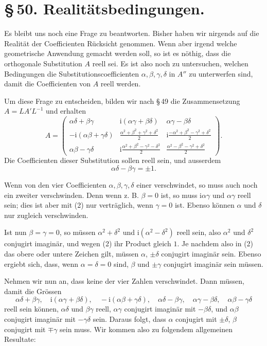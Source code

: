 \documentclass[11pt]{article}
\providecommand{\ii}{\mathrm{i}}
\begin{document}
\section*{\S\,50. Realitätsbedingungen.}

Es bleibt uns noch eine Frage zu beantworten. Bisher haben wir nirgends auf die Realität der Coefficienten Rücksicht genommen. Wenn aber irgend welche geometrische Anwendung gemacht werden soll, so ist es nöthig, dass die orthogonale Substitution $A$ reell sei. Es ist also noch zu untersuchen, welchen Bedingungen die Substitutionscoefficienten $\alpha,\beta,\gamma,\delta$ in $A''$ zu unterwerfen sind, damit die Coefficienten von $A$ reell werden.

Um diese Frage zu entscheiden, bilden wir nach \S\,49 die Zusammensetzung $A=LA'L^{-1}$ und erhalten
\begin{equation}
A=\begin{pmatrix}
\alpha\delta+\beta\gamma & \ii(\alpha\gamma+\beta\delta) & \alpha\gamma-\beta\delta\\
-\ii(\alpha\beta+\gamma\delta)&\frac{\alpha^2+\beta^2+\gamma^2+\delta^2}{2}&\ii\frac{-\alpha^2+\beta^2-\gamma^2+\delta^2}{2}\\
\alpha\beta-\gamma\delta&\ii\frac{\alpha^2+\beta^2-\gamma^2-\delta^2}{2}&\frac{\alpha^2-\beta^2-\gamma^2+\delta^2}{2}
\end{pmatrix}.
\tag{1}
\end{equation}
Die Coefficienten dieser Substitution sollen reell sein, und ausserdem
\begin{equation}
\alpha\delta-\beta\gamma=\pm1.
\tag{2}
\end{equation}

Wenn von den vier Coefficienten $\alpha,\beta,\gamma,\delta$ einer verschwindet, so muss auch noch ein zweiter verschwinden. Denn wenn z. B. $\beta=0$ ist, so muss $\ii\alpha\gamma$ und $\alpha\gamma$ reell sein; dies ist aber mit (2) nur verträglich, wenn $\gamma=0$ ist. Ebenso können $\alpha$ und $\delta$ nur zugleich verschwinden.

Ist nun $\beta=\gamma=0$, so müssen $\alpha^2+\delta^2$ und $\ii(\alpha^2-\delta^2)$ reell sein, also $\alpha^2$ und $\delta^2$ conjugirt imaginär, und wegen (2) ihr Product gleich $1$. Je nachdem also in (2) das obere oder untere Zeichen gilt, müssen $\alpha$, $\pm\delta$ conjugirt imaginär sein. Ebenso ergiebt sich, dass, wenn $\alpha=\delta=0$ sind, $\beta$ und $\pm\gamma$ conjugirt imaginär sein müssen.

Nehmen wir nun an, dass keine der vier Zahlen verschwindet. Dann müssen, damit die Grössen
\[
\alpha\delta+\beta\gamma,\quad \ii(\alpha\gamma+\beta\delta),\quad -\ii(\alpha\beta+\gamma\delta),
\quad \alpha\delta-\beta\gamma,\quad \alpha\gamma-\beta\delta,
\quad \alpha\beta-\gamma\delta
\]
reell sein können, $\alpha\delta$ und $\beta\gamma$ reell, $\alpha\gamma$ conjugirt imaginär mit $-\beta\delta$, und $\alpha\beta$ conjugirt imaginär mit $-\gamma\delta$ sein. Daraus folgt, dass $\alpha$ conjugirt mit $\pm\delta$, $\beta$ conjugirt mit $\mp\gamma$ sein muss. Wir kommen also zu folgendem allgemeinen Resultate:
\end{document}
